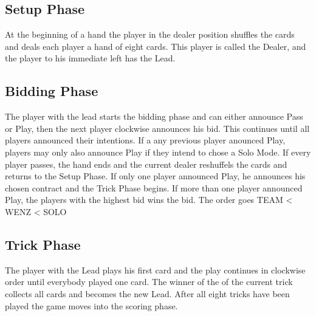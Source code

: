 \subsection{Setup Phase}
At the beginning of a hand the player in the dealer position shuffles the cards and deals each player a hand of eight
cards.
This player is called the Dealer, and the player to his immediate left has the Lead.
\subsection{Bidding Phase}
The player with the lead starts the bidding phase and can either announce Pass or Play, then the next player clockwise announces his bid.
This continues until all players announced their intentions.
If a any previous player anounced Play, players may only also announce Play if they intend to chose a Solo Mode.
If every player passes, the hand ends and the current dealer reshuffels the cards and returns to
the Setup Phase.
If only one player announced Play, he announces his chosen contract and the Trick Phase begins.
If more than one player announced Play, the players with the highest bid wins the bid.
The order goes TEAM < WENZ < SOLO
\subsection{Trick Phase}
The player with the Lead plays his first card and the play continues in clockwise order until everybody played one
card.
The winner of the of the current trick collects all cards and becomes the new Lead.
After all eight tricks have been played the game moves into the scoring phase.

